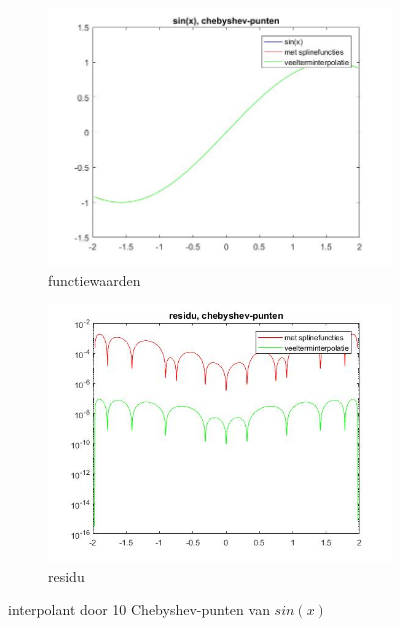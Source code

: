 \begin{figure}[H]
\centering
\begin{subfigure}{.5\textwidth}
  \centering
  \includegraphics[width=\linewidth]{afbeeldingen/sin_cheb.jpg}
  \caption{functiewaarden}
\end{subfigure}%
\begin{subfigure}{.5\textwidth}
  \centering
  \includegraphics[width=\linewidth]{afbeeldingen/sin_cheb_res.jpg}
  \caption{residu}
\end{subfigure}
\caption{interpolant door 10 Chebyshev-punten van $sin(x)$}
\label{fig:sincheb}
\end{figure}

